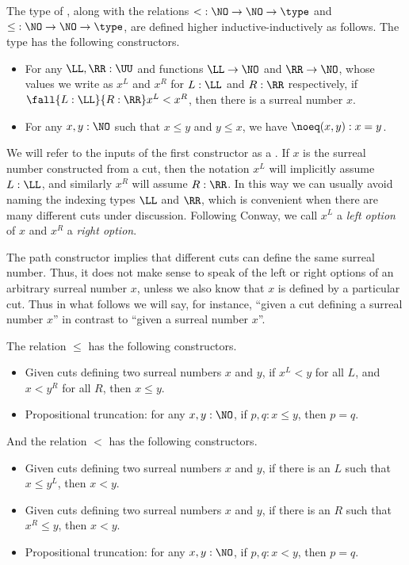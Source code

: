 \begin{defn}\label{defn:surreals}
  The type \NO of ,
  along with the relations $\mathord<:\NO\to\NO\to\type$ and $\mathord\le:\NO\to\NO\to\type$, are defined higher inductive-inductively as follows.
  The type \NO has the following constructors.
  \begin{itemize}
  \item For any $\LL,\RR:\UU$ and functions $\LL\to \NO$ and $\RR\to \NO$, whose values we write as $x^L$ and $x^R$ for $L:\LL$ and $R:\RR$ respectively, if $\fall{L:\LL}{R:\RR} x^L<x^R$, then there is a surreal number $x$.
  \item For any $x,y:\NO$ such that $x\le y$ and $y\le x$, we have $\noeq(x,y):x=y$.
  \end{itemize}
  We will refer to the inputs of the first constructor as a .
  If $x$ is the surreal number constructed from a cut, then the notation $x^L$ will implicitly assume $L:\LL$, and similarly $x^R$ will assume $R:\RR$.
  In this way we can usually avoid naming the indexing types $\LL$ and $\RR$, which is convenient when there are many different cuts under discussion.
  Following Conway, we call $x^L$ a \emph{left option} of $x$ and $x^R$ a \emph{right option}.

  The path constructor implies that different cuts can define the same surreal number.
  Thus, it does not make sense to speak of the left or right options of an arbitrary surreal number $x$, unless we also know that $x$ is defined by a particular cut.
  Thus in what follows we will say, for instance, ``given a cut defining a surreal number $x$'' in contrast to ``given a surreal number $x$''.

  The relation $\le$ has the following constructors.
  \begin{itemize}
  \item Given cuts defining two surreal numbers $x$ and $y$, if $x^L<y$ for all $L$, and $x<y^R$ for all $R$, then $x\le y$.
  \item Propositional truncation:
    for any $x,y:\NO$, if $p,q:x\le y$, then $p=q$.
  \end{itemize}
  And the relation $<$ has the following constructors.
  \begin{itemize}
  \item Given cuts defining two surreal numbers $x$ and $y$, if there is an $L$ such that $x\le y^L$, then $x<y$.
  \item Given cuts defining two surreal numbers $x$ and $y$, if there is an $R$ such that $x^R\le y$, then $x<y$.
  \item Propositional truncation: for any $x,y:\NO$, if $p,q:x<y$, then $p=q$.
  \end{itemize}
\end{defn}

